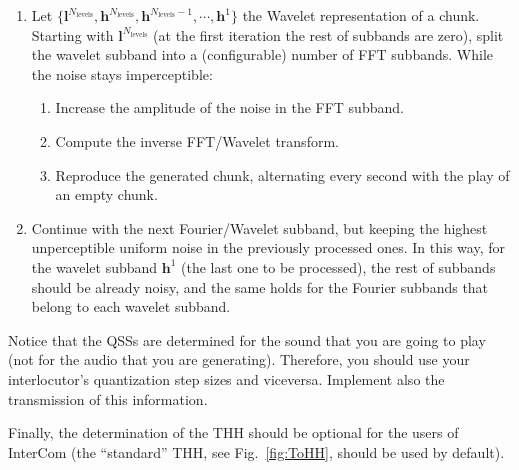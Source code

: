\begin{enumerate}
\item Let
  $\{{\mathbf l}^{N_{\text{levels}}}, {\mathbf h}^{N_{\text{levels}}},
  {\mathbf h}^{N_{\text{levels}}-1},\cdots, {\mathbf h}^1\}$ the
  Wavelet representation of a
  chunk. %
  Starting with ${\mathbf l}^{N_{\text{levels}}}$ (at the first
  iteration the rest of subbands are zero), split the wavelet subband
  into a (configurable) number of FFT subbands. While the noise stays
  imperceptible:
  \begin{enumerate}
  \item Increase the amplitude of the noise in the FFT subband.
  \item Compute the inverse FFT/Wavelet transform.
  \item Reproduce the generated chunk, alternating every second with
    the play of an empty chunk.
  \end{enumerate}
\item Continue with the next Fourier/Wavelet subband, but keeping the
  highest unperceptible uniform noise in the previously processed
  ones. In this way, for the wavelet subband ${\mathbf h}^1$ (the last
  one to be processed), the rest of subbands should be already
  noisy, and the same holds for the Fourier subbands that
  belong to each wavelet subband.
\end{enumerate}

Notice that the QSSs are determined for the sound that you are going
to play (not for the audio that you are generating). Therefore, you
should use your interlocutor's quantization step sizes and
viceversa. Implement also the transmission of this information.

Finally, the determination of the THH should be optional for the users of
InterCom (the ``standard'' THH, see Fig.~\ref{fig:ToHH}, should be
used by default).

\begin{comment}
\subsection{Subjective performance}

\begin{enumerate}
\item Using a recording tool such as
  \href{http://audacity.sourceforge.net}{Audacity} or
  \href{http://plugin.org.uk/timemachine/}{JACK Timemachine}, record
  the simulated transmission of a piece of audio and create a
  \texttt{.wav} file, when the audio has been transmitted using
  \texttt{temporal\_overlapped\_DWT\_coding.py} and
  \texttt{threshold.py}, using in both cases the same transmission
  bit-rate. Vary the quantization step size for controlling the
  bit-rate.
\item Determine which audio sounds better, from a subjective point of
  view. Repeat this step the number of times you consider necessary.
\end{enumerate}
\end{comment}

